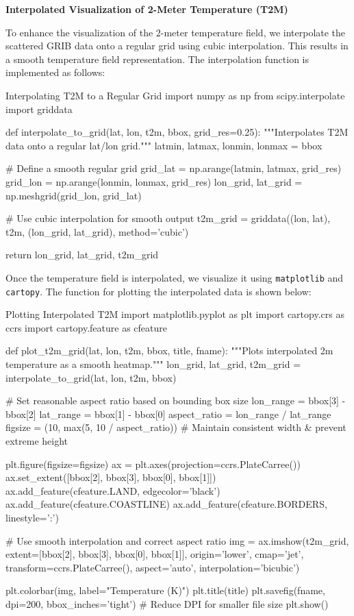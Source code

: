 {\bf Interpolated Visualization of 2-Meter Temperature (T2M)}

To enhance the visualization of the 2-meter temperature field, we interpolate the scattered GRIB data onto a regular grid using cubic interpolation. This results in a smooth temperature field representation. The interpolation function is implemented as follows:

\begin{codeonly}{Interpolating T2M to a Regular Grid}
import numpy as np
from scipy.interpolate import griddata

def interpolate_to_grid(lat, lon, t2m, bbox, grid_res=0.25):
    """Interpolates T2M data onto a regular lat/lon grid."""
    latmin, latmax, lonmin, lonmax = bbox

    # Define a smooth regular grid
    grid_lat = np.arange(latmin, latmax, grid_res)
    grid_lon = np.arange(lonmin, lonmax, grid_res)
    lon_grid, lat_grid = np.meshgrid(grid_lon, grid_lat)

    # Use cubic interpolation for smooth output
    t2m_grid = griddata((lon, lat), t2m, (lon_grid, lat_grid), method='cubic')

    return lon_grid, lat_grid, t2m_grid
\end{codeonly}

Once the temperature field is interpolated, we visualize it using \texttt{matplotlib} and \texttt{cartopy}. The function for plotting the interpolated data is shown below:

\begin{codeonly}{Plotting Interpolated T2M}
import matplotlib.pyplot as plt
import cartopy.crs as ccrs
import cartopy.feature as cfeature

def plot_t2m_grid(lat, lon, t2m, bbox, title, fname):
    """Plots interpolated 2m temperature as a smooth heatmap."""
    lon_grid, lat_grid, t2m_grid = interpolate_to_grid(lat, lon, t2m, bbox)

    # Set reasonable aspect ratio based on bounding box size
    lon_range = bbox[3] - bbox[2]
    lat_range = bbox[1] - bbox[0]
    aspect_ratio = lon_range / lat_range
    figsize = (10, max(5, 10 / aspect_ratio))  # Maintain consistent width & prevent extreme height

    plt.figure(figsize=figsize)
    ax = plt.axes(projection=ccrs.PlateCarree())
    ax.set_extent([bbox[2], bbox[3], bbox[0], bbox[1]])
    ax.add_feature(cfeature.LAND, edgecolor='black')
    ax.add_feature(cfeature.COASTLINE)
    ax.add_feature(cfeature.BORDERS, linestyle=':')

    # Use smooth interpolation and correct aspect ratio
    img = ax.imshow(t2m_grid, extent=[bbox[2], bbox[3], bbox[0], bbox[1]], origin='lower',
                    cmap='jet', transform=ccrs.PlateCarree(), aspect='auto', interpolation='bicubic')

    plt.colorbar(img, label="Temperature (K)")
    plt.title(title)
    plt.savefig(fname, dpi=200, bbox_inches='tight')  # Reduce DPI for smaller file size
    plt.show()
\end{codeonly}

